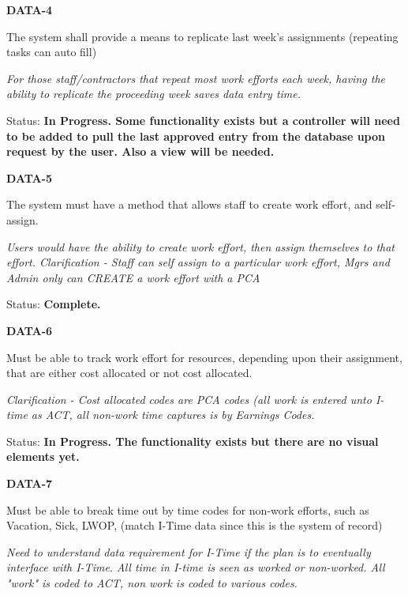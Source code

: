 \noindent 

\noindent \textbf{DATA-4}

\noindent The system shall provide a means to replicate last week's assignments (repeating tasks can auto fill)

\noindent \textit{For those staff/contractors that repeat most work efforts each week, having the ability to replicate the proceeding week saves data entry time.}

\noindent Status: \textbf{In Progress.  Some functionality exists but a controller will need to be added to pull the last approved entry from the database upon request by the user.  Also a view will be needed.}\textit{}\\

\noindent 

\noindent \textbf{DATA-5}

\noindent The system must have a method that allows staff to create work effort, and self-assign.

\noindent \textit{Users would have the ability to create work effort, then assign themselves to that effort. Clarification - Staff can self assign to a particular work effort, Mgrs and Admin only can CREATE a work effort with a PCA}

Status: \textbf{Complete.}\textit{}\\

\noindent 

\noindent \textbf{DATA-6}

\noindent Must be able to track work effort for resources, depending upon their assignment, that are either cost allocated or not cost allocated. 

\noindent \textit{Clarification - Cost allocated codes are PCA codes (all work is entered unto I-time as ACT, all non-work time captures is by Earnings Codes.}

Status: \textbf{In Progress.  The functionality exists but there are no visual elements yet.}\textit{}\\

\noindent 

\noindent \textbf{DATA-7}

\noindent Must be able to break time out by time codes for non-work efforts, such as Vacation, Sick, LWOP, (match I-Time data since this is the system of record)

\noindent \textit{Need to understand data requirement for I-Time if the plan is to eventually interface with I-Time.} \textit{All time in I-time is seen as worked or non-worked.  All "work" is coded to ACT, non work is coded to various codes.}

